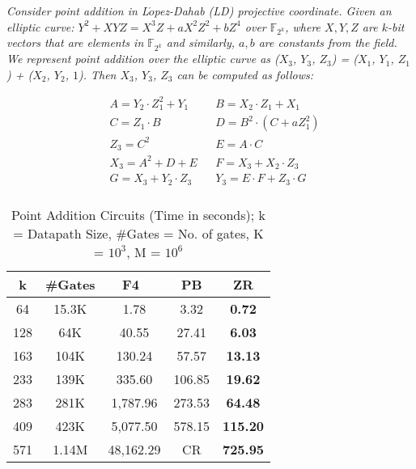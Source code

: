 \begin{Example}
{\it Consider point addition in L$\acute{o}$pez-Dahab (LD) projective coordinate. Given an elliptic curve: $Y^2 + XYZ = X^3Z + aX^2Z^2 + bZ^4$ over $\mathbb{F}_{2^k}$, where $X,Y,Z$ are $k$-bit vectors that are elements in $\mathbb{F}_{2^k}$ and similarly, $a, b$ are constants from the field. We represent point addition over the elliptic curve as ($X_3$, $Y_3$, $Z_3$) = ($X_1$, $Y_1$, $Z_1$) + ($X_2$, $Y_2$, $1$).  Then $X_3$, $Y_3$, $Z_3$ can be computed as follows:} 

\begin{align*}
&A = Y_2 \cdot Z_1^2 + Y_1  &&B = X_2 \cdot Z_1 + X_1 \\
&C = Z_1 \cdot B  &&D = B^2 \cdot(C + a Z_1^2) \\
&Z_3 = C^2 && E = A \cdot C  \\
&X_3 = A^2 + D + E &&F = X_3 + X_2 \cdot Z_3 \\
&G = X_3 + Y_2\cdot Z_3 && Y_3 = E\cdot F + Z_3 \cdot G \\
\end{align*}
\end{Example}

\begin{table}[H]
\centering
\caption{Point Addition Circuits (Time in seconds); k = Datapath Size, \#Gates = No. of gates, K = $10^3$, M = $10^6$}
\label{pointadd}
\begin{tabular}{| c | c | c | c | c |} \hline
\textbf{k}&\textbf{\#Gates}&\textbf{F4~\cite{pruss:tcad}}&\textbf{PB}&\textbf{ZR} \\ \hline
64&15.3K&1.78&3.32&\textbf{0.72} \\ \hline
128&64K&40.55&27.41&\textbf{6.03} \\ \hline
163&104K&130.24&57.57&\textbf{13.13} \\ \hline
233&139K&335.60&106.85&\textbf{19.62} \\ \hline
283&281K&1,787.96&273.53& \textbf{64.48}\\ \hline
409&423K&5,077.50&578.15& \textbf{115.20}\\ \hline
571&1.14M&48,162.29&CR&\textbf{725.95} \\ \hline
\end{tabular}
\end{table}


